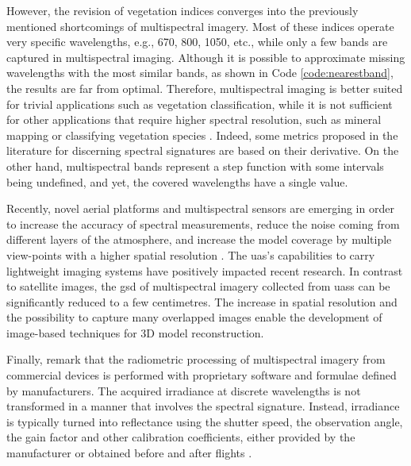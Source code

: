 However, the revision of vegetation indices converges into the previously mentioned shortcomings of multispectral imagery. Most of these indices operate very specific wavelengths, e.g., 670, 800, 1050, etc., while only a few bands are captured in multispectral imaging. Although it is possible to approximate missing wavelengths with the most similar bands, as shown in Code \ref{code:nearestband}, the results are far from optimal. Therefore, multispectral imaging is better suited for trivial applications such as vegetation classification, while it is not sufficient for other applications that require higher spectral resolution, such as mineral mapping or classifying vegetation species \cite{navulur_multispectral_2006, pu_hyperspectral_2017}. Indeed, some metrics proposed in the literature for discerning spectral signatures are based on their derivative. On the other hand, multispectral bands represent a step function with some intervals being undefined, and yet, the covered wavelengths have a single value.

\vspace{3mm}



Recently, novel aerial platforms and multispectral sensors are emerging in order to increase the accuracy of spectral measurements, reduce the noise coming from different layers of the atmosphere, and increase the model coverage by multiple view-points with a higher spatial resolution \cite{deng_uav-based_2018}. The \acrshort{uas}’s capabilities to carry lightweight imaging systems have positively impacted recent research. In contrast to satellite images, the \acrshort{gsd} of multispectral imagery collected from \acrshort{uas}s can be significantly reduced to a few centimetres. The increase in spatial resolution and the possibility to capture many overlapped images enable the development of image-based techniques for 3D model reconstruction.

Finally, remark that the radiometric processing of multispectral imagery from commercial devices is performed with proprietary software and formulae defined by manufacturers. The acquired irradiance at discrete wavelengths is not transformed in a manner that involves the spectral signature. Instead, irradiance is typically turned into reflectance using the shutter speed, the observation angle, the gain factor and other calibration coefficients, either provided by the manufacturer or obtained before and after flights \cite{jurado_semantic_2020, candiago_evaluating_2015}.

